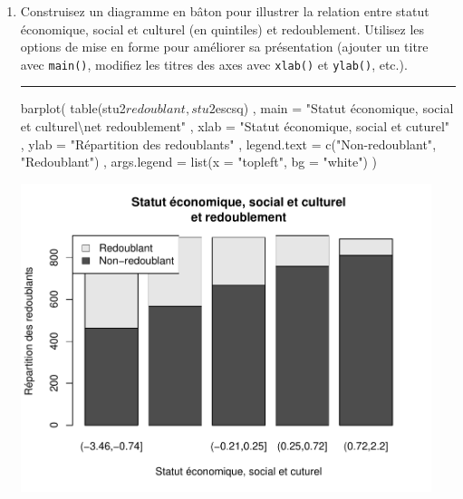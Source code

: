 \documentclass[12pt,twosided, notitlepage]{book}
\newenvironment{Shaded}{}{}
\newcommand{\CharTok}[1]{\textcolor[rgb]{0.00,0.50,0.50}{#1}}
\newcommand{\DataTypeTok}[1]{#1}
\newcommand{\KeywordTok}[1]{\textcolor[rgb]{0.00,0.00,1.00}{#1}}
\newcommand{\NormalTok}[1]{#1}
\newcommand{\OperatorTok}[1]{#1}
\newcommand{\StringTok}[1]{\textcolor[rgb]{0.00,0.50,0.50}{#1}}
\newif \ifsol
\renewenvironment{Shaded}{\begin{snugshade}}{\end{snugshade}}
\begin{document}
\begin{enumerate}
\def\labelenumi{\alph{enumi}.}
\item
  Construisez un diagramme en bâton pour illustrer la relation entre
  statut économique, social et culturel (en quintiles) et redoublement.
  Utilisez les options de mise en forme pour améliorer sa présentation
  (ajouter un titre avec \texttt{main()}, modifiez les titres des axes
  avec \texttt{xlab()} et \texttt{ylab()},
  etc.).

  \ifsol 

  \begin{center} \rule{0.5\linewidth}{\linethickness}\end{center}

\begin{Shaded}
\begin{Highlighting}[]
\KeywordTok{barplot}\NormalTok{(}
  \KeywordTok{table}\NormalTok{(stu2}\OperatorTok{$}\NormalTok{redoublant, stu2}\OperatorTok{$}\NormalTok{escsq)}
\NormalTok{  , }\DataTypeTok{main =} \StringTok{"Statut économique, social et culturel}\CharTok{\textbackslash{}n}\StringTok{et redoublement"}
\NormalTok{  , }\DataTypeTok{xlab =} \StringTok{"Statut économique, social et cuturel"}
\NormalTok{  , }\DataTypeTok{ylab =} \StringTok{"Répartition des redoublants"}
\NormalTok{  , }\DataTypeTok{legend.text =} \KeywordTok{c}\NormalTok{(}\StringTok{"Non-redoublant"}\NormalTok{, }\StringTok{"Redoublant"}\NormalTok{)}
\NormalTok{  , }\DataTypeTok{args.legend =} \KeywordTok{list}\NormalTok{(}\DataTypeTok{x =} \StringTok{"topleft"}\NormalTok{, }\DataTypeTok{bg =} \StringTok{"white"}\NormalTok{)}
\NormalTok{)}
\end{Highlighting}
\end{Shaded}

  \begin{center}\includegraphics[width=12cm]{livret_files/figure-latex/unnamed-chunk-479-1} \end{center}


\end{enumerate}
\end{document}
